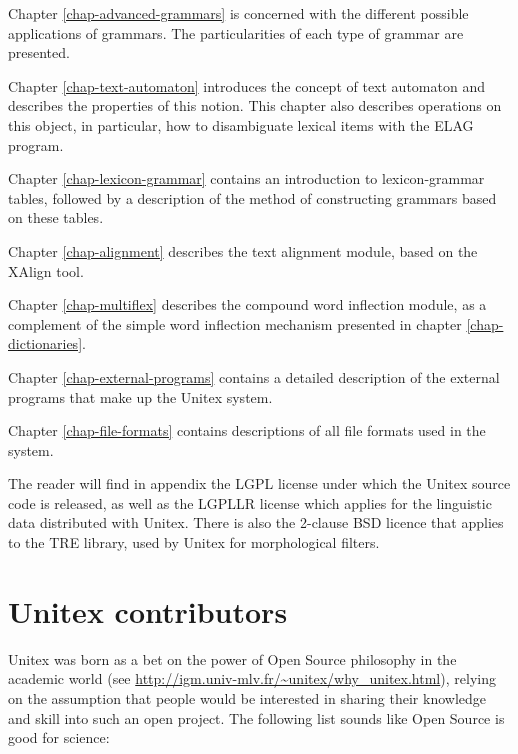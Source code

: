 \bigskip \noindent Chapter \ref{chap-advanced-grammars} is concerned
with the different possible applications of grammars. The particularities of each type of grammar are
presented.

\bigskip \noindent Chapter \ref{chap-text-automaton} introduces the 
concept of text automaton and describes the properties of this notion. This chapter also describes 
operations on this object, in particular, how to disambiguate lexical items with
the ELAG program.

\bigskip \noindent Chapter \ref{chap-lexicon-grammar} contains an
introduction to lexicon-grammar tables, followed by a description of the method of constructing grammars based on these
tables.

\bigskip \noindent Chapter \ref{chap-alignment} describes the text
alignment module, based on the XAlign tool.

\bigskip \noindent Chapter \ref{chap-multiflex} describes the compound word
inflection module, as a complement of the simple word inflection mechanism
presented in chapter \ref{chap-dictionaries}.

\bigskip \noindent Chapter \ref{chap-external-programs} contains a
detailed description of the external programs that make up the Unitex system.

\bigskip \noindent Chapter \ref{chap-file-formats} contains
descriptions of all file formats used in the system. 


\bigskip \noindent The reader will find in appendix the LGPL license
under which the Unitex source code is released, as well as the LGPLLR license
which applies for the linguistic data distributed with Unitex. There is also
the 2-clause BSD licence that applies to the TRE library, used by Unitex for 
morphological filters.


\section*{Unitex contributors}
Unitex was born as a bet on the power of Open Source philosophy in the academic
world (see \url{http://igm.univ-mlv.fr/~unitex/why_unitex.html}), 
relying on the assumption that people would be interested in sharing
their knowledge and skill into such an open project. The following list
sounds like Open Source is good for science:

